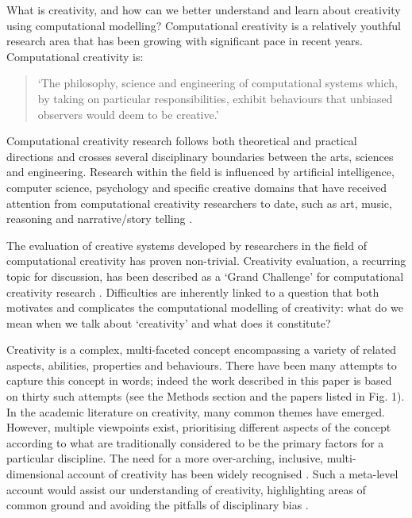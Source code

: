 \documentclass[10pt,letterpaper]{article}
\begin{document}
What is creativity, and how can we better understand and learn about creativity using computational modelling? Computational creativity is a relatively youthful research area that has been growing with significant pace in recent years. Computational creativity is: 
\begin{quote}`The philosophy, science and engineering of computational systems which, by taking on particular responsibilities, exhibit behaviours that unbiased observers would deem to be creative.' 
\cite[p. 21]{coltonwiggins12}
\end{quote}

Computational creativity research follows both theoretical and practical directions and crosses several disciplinary boundaries between the arts, sciences and engineering. Research within the field is influenced by artificial intelligence, computer science, psychology and specific creative domains that have received attention from computational creativity researchers to date, such as art, music, reasoning and narrative/story telling \cite[provide examples]{colton08,widmerAIM09,leon10MM,perezyperez99}. 

The evaluation of creative systems developed by researchers in the field of computational creativity has proven non-trivial. Creativity evaluation, a recurring topic for discussion, has been described as a `Grand Challenge' for computational creativity research \cite{cardoso09}. Difficulties are inherently linked to a question that both motivates and complicates the computational modelling of creativity: what  do we mean when we talk about `creativity' and what does it constitute?

Creativity is a complex, multi-faceted concept encompassing a variety of related aspects, abilities, properties and behaviours. There have been many attempts to capture this concept in words; indeed the work described in this paper is based on thirty such attempts (see the Methods section and the papers listed in Fig. 1).  %
In the academic literature on creativity, many common themes have emerged. 
However, multiple viewpoints exist, prioritising different aspects of the concept according to what are traditionally considered to be the primary factors for a particular discipline. 
The need for a more over-arching, inclusive, multi-dimensional account of creativity has been widely recognised \cite{rhodes61,torrance67,plucker04defn,kaufman09}. Such a meta-level account would assist our understanding of creativity, highlighting areas of common ground and avoiding the pitfalls of disciplinary bias \cite{hennessey10,plucker04}.
\end{document}
